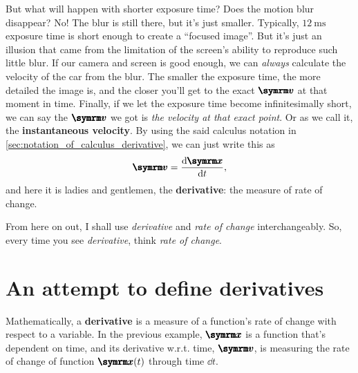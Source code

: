 But what will happen with shorter exposure time? Does the motion blur disappear? No! The blur is still there, but it's just smaller. Typically, $\qty{12}{\ms}$ exposure time is short enough to create a ``focused image''. But it's just an illusion that came from the limitation of the screen's ability to reproduce such little blur. If our camera and screen is good enough, we can \emph{always} calculate the velocity of the car from the blur. The smaller the exposure time, the more detailed the image is, and the closer you'll get to the exact $\vv{v}$ at that moment in time. Finally, if we let the exposure time become infinitesimally short, we can say the $\vv{v}$ we got is \emph{the velocity at that exact point}. Or as we call it, the \textbf{instantaneous velocity}. By using the said calculus notation in \cref{sec:notation_of_calculus_derivative}, we can just write this as
\begin{equation}
    \vv{v} = \dv{\vv{x}}{t}, \label{eq:first_intro_to_derivative}
\end{equation}
and here it is ladies and gentlemen, the \textbf{derivative}: the measure of rate of change.

From here on out, I shall use \emph{derivative} and \emph{rate of change} interchangeably. So, every time you see \emph{derivative}, think \emph{rate of change}.

\section{An attempt to define derivatives}

Mathematically, a \textbf{derivative} is a measure of a function's rate of change with respect to a variable. In the previous example, $\vv{x}$ is a function that's dependent on time, and its derivative w.r.t. time, $\vv{v}$, is measuring the rate of change of function $\vv{x}(t)$ through time $\dd{t}$.

